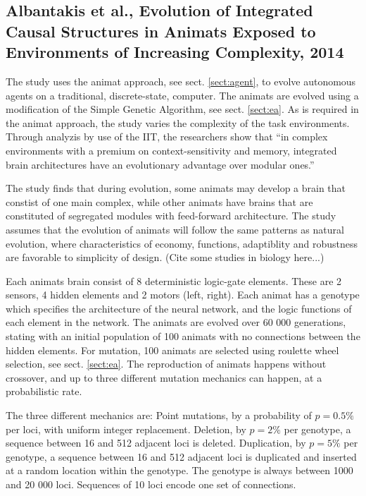 \subsection{Albantakis et al., Evolution of Integrated Causal Structures in Animats Exposed to Environments of Increasing Complexity, 2014}
The study uses the animat approach, see sect. \vref{sect:agent}, to evolve autonomous agents on a traditional, discrete-state, computer.
The animats are evolved using a modification of the Simple Genetic Algorithm, see sect. \vref{sect:ea}.
As is required in the animat approach, the study varies the complexity of the task environments.
Through analyzis by use of the IIT, the researchers show that ``in complex environments with a premium on context-sensitivity and memory, integrated brain architectures have an evolutionary advantage over modular ones.''\cite{albantakis_evolution_2014-1}

The study finds that during evolution, some animats may develop a brain that constist of one main complex, while other animats have brains that are constituted of segregated modules with feed-forward architecture. The study assumes that the evolution of animats will follow the same patterns as natural evolution, where characteristics of economy, functions, adaptiblity and robustness are favorable to simplicity of design. (Cite some studies in biology here...)

Each animats brain consist of 8 deterministic logic-gate elements. These are 2 sensors, 4 hidden elements and 2 motors (left, right).
Each animat has a genotype which specifies the architecture of the neural network, and the logic functions of each element in the network.
The animats are evolved over 60 000 generations, stating with an initial population of 100 animats with no connections between the hidden elements.
For mutation, 100 animats are selected using roulette wheel selection, see sect. \vref{sect:ea}.
The reproduction of animats happens without crossover, and up to three different mutation mechanics can happen, at a probabilistic rate.\cite{albantakis_evolution_2014}

The three different mechanics are: Point mutations, by a probability of $p = 0.5 \%$ per loci, with uniform integer replacement. Deletion, by $p = 2\%$ per genotype, a sequence between 16 and 512 adjacent loci is deleted. Duplication, by $p = 5\%$ per genotype, a sequence between 16 and 512 adjacent loci is duplicated and inserted at a random location within the genotype.
The genotype is always between 1000 and 20 000 loci. Sequences of 10 loci encode one set of connections.\cite{albantakis_evolution_2014}

